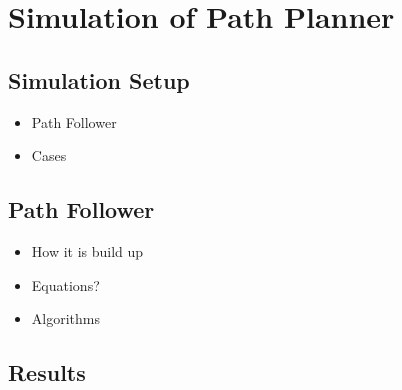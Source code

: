 \section{Simulation of Path Planner}

\subsection{Simulation Setup}

\begin{itemize}
	\item Path Follower
	\item Cases
\end{itemize}


\subsection{Path Follower}
\label{ch:path_follower}

\begin{itemize}
	\item How it is build up
	\item Equations?
	\item Algorithms
\end{itemize}


\subsection{Results}